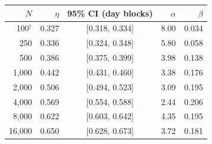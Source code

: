 \begin{tabular}{rrcrr}
\toprule
\(N\) & \(\eta\) & 95\% CI (day blocks) & \(\alpha\) & \(\beta\) \\
\midrule
100\(^\dagger\) & 0.327 & [0.318, 0.334] & 8.00 & 0.034 \\
250 & 0.336 & [0.324, 0.348] & 5.80 & 0.058 \\
500 & 0.386 & [0.375, 0.399] & 3.98 & 0.138 \\
1,000 & 0.442 & [0.431, 0.460] & 3.38 & 0.176 \\
2,000 & 0.506 & [0.494, 0.523] & 3.09 & 0.195 \\
4,000 & 0.569 & [0.554, 0.588] & 2.44 & 0.206 \\
8,000 & 0.622 & [0.603, 0.642] & 4.35 & 0.195 \\
16,000 & 0.650 & [0.628, 0.673] & 3.72 & 0.181 \\
\bottomrule
\end{tabular}
